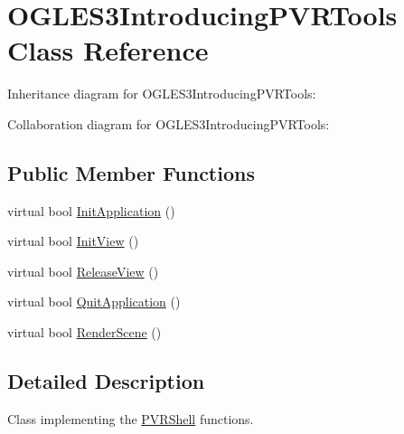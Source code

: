 \hypertarget{class_o_g_l_e_s3_introducing_p_v_r_tools}{\section{O\+G\+L\+E\+S3\+Introducing\+P\+V\+R\+Tools Class Reference}
\label{class_o_g_l_e_s3_introducing_p_v_r_tools}
}


Inheritance diagram for O\+G\+L\+E\+S3\+Introducing\+P\+V\+R\+Tools\+:


Collaboration diagram for O\+G\+L\+E\+S3\+Introducing\+P\+V\+R\+Tools\+:
\subsection*{Public Member Functions}
\begin{DoxyCompactItemize}
\item 
virtual bool \hyperlink{class_o_g_l_e_s3_introducing_p_v_r_tools_a92abedead99e0e31eaeeee85ccc64367}{Init\+Application} ()
\item 
virtual bool \hyperlink{class_o_g_l_e_s3_introducing_p_v_r_tools_a584e7909eb20ad75038c6a353b80e1d5}{Init\+View} ()
\item 
virtual bool \hyperlink{class_o_g_l_e_s3_introducing_p_v_r_tools_af810f2ae8d027971e3086ded8d7962d0}{Release\+View} ()
\item 
virtual bool \hyperlink{class_o_g_l_e_s3_introducing_p_v_r_tools_a5616fb89deac76a76548df6d717f4699}{Quit\+Application} ()
\item 
virtual bool \hyperlink{class_o_g_l_e_s3_introducing_p_v_r_tools_acfb78eeb09d88dd59f1368e0280d090e}{Render\+Scene} ()
\end{DoxyCompactItemize}


\subsection{Detailed Description}


 Class implementing the \hyperlink{class_p_v_r_shell}{P\+V\+R\+Shell} functions. 

